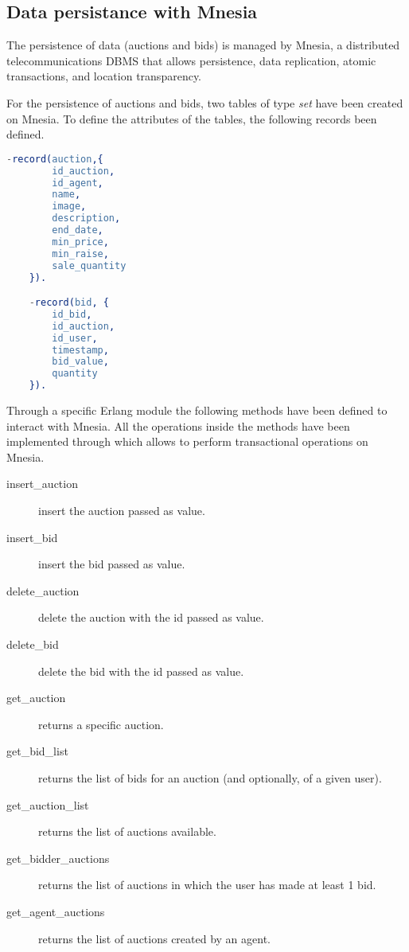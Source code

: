 \subsection{Data persistance with Mnesia}\label{subsec:archmnesia}

The persistence of data (auctions and bids) is managed by Mnesia, a distributed
telecommunications DBMS that allows persistence, data replication, atomic
transactions, and location transparency.

For the persistence of auctions and bids, two tables of type \textit{set} have
been created on Mnesia. To define the attributes of the tables, the following
records been defined.

\begin{lstlisting}[language=Erlang, caption=Mnesia Record]
    -record(auction,{
        id_auction,
        id_agent,
        name,
        image,
        description,
        end_date,
        min_price,
        min_raise,
        sale_quantity
    }).

    -record(bid, {
        id_bid,
        id_auction,
        id_user,
        timestamp,
        bid_value,
        quantity
    }).
\end{lstlisting}

Through a specific Erlang module the following methods have been defined to
interact with Mnesia. All the operations inside the methods have been
implemented through  which allows to perform
transactional operations on Mnesia.

\begin{description}
	\item[insert\_auction] insert the auction passed as value.
	\item[insert\_bid] insert the bid passed as value.
	\item[delete\_auction] delete the auction with the id passed as value.
	\item[delete\_bid] delete the bid with the id passed as value.
	\item[get\_auction] returns a specific auction.
	\item[get\_bid\_list] returns the list of bids for an auction (and
		optionally, of a given user).
	\item[get\_auction\_list] returns the list of auctions available.
	\item[get\_bidder\_auctions] returns the list of auctions in which the
		user has made at least 1 bid.
	\item[get\_agent\_auctions] returns the list of auctions created by an
		agent.
\end{description}
